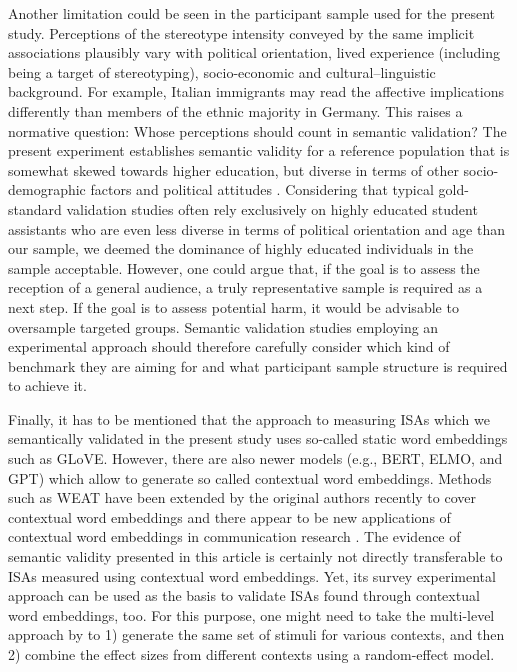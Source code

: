 Another limitation could be seen in the participant sample used for the present study. Perceptions of the stereotype intensity conveyed by the same implicit associations plausibly vary with political orientation, lived experience (including being a target of stereotyping), socio-economic and cultural–linguistic background. For example, Italian immigrants may read the affective implications differently than members of the ethnic majority in Germany. This raises a normative question: Whose perceptions should count in semantic validation? The present experiment establishes semantic validity for a reference population that is somewhat skewed towards higher education, but diverse in terms of other socio-demographic factors and political attitudes \parencite{leiner2016}. Considering that typical gold-standard validation studies often rely exclusively on highly educated student assistants who are even less diverse in terms of political orientation and age than our sample, we deemed the dominance of highly educated individuals in the sample acceptable. However, one could argue that, if the goal is to assess the reception of a general audience, a truly representative sample is required as a next step. If the goal is to assess potential harm, it would be advisable to oversample targeted groups. Semantic validation studies employing an experimental approach should therefore carefully consider which kind of benchmark they are aiming for and what participant sample structure is required to achieve it.

Finally, it has to be mentioned that the approach to measuring ISAs which we semantically validated in the present study uses so-called static word embeddings such as GLoVE. However, there are also newer models (e.g., BERT, ELMO, and GPT) which allow to generate so called contextual word embeddings. Methods such as WEAT have been extended by the original authors recently to cover contextual word embeddings \parencite{guo:2021:DEI} and there appear to be new applications of contextual word embeddings in communication research \parencite{thijs:2024:CWE}. The evidence of semantic validity presented in this article is certainly not directly transferable to ISAs measured using contextual word embeddings. Yet, its survey experimental approach can be used as the basis to validate ISAs found through contextual word embeddings, too. For this purpose, one might need to take the multi-level approach by \textcite{guo:2021:DEI} to 1) generate the same set of stimuli for various contexts, and then 2) combine the effect sizes from different contexts using a random-effect model.

